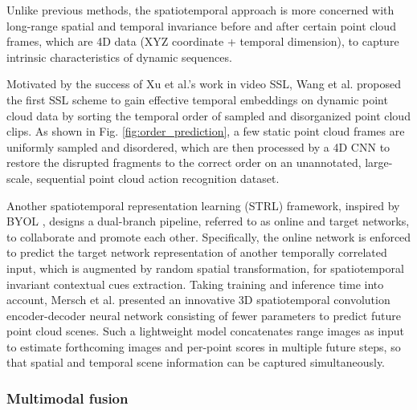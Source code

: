 \documentclass[a4paper,fleqn]{cas-dc}
\begin{document}
Unlike previous methods, the spatiotemporal approach is more concerned with long-range spatial and temporal invariance before and after certain point cloud frames, which are 4D data (XYZ coordinate + temporal dimension), to capture intrinsic characteristics of dynamic sequences.

Motivated by the success of Xu et al.'s work \citep{xu2019self} in video SSL, Wang et al. proposed the first SSL scheme to gain effective temporal embeddings on dynamic point cloud data by sorting the temporal order of sampled and disorganized point cloud clips. As shown in Fig. \ref{fig:order_prediction}, a few static point cloud frames are uniformly sampled and disordered, which are then processed by a 4D CNN to restore the disrupted fragments to the correct order on an unannotated, large-scale, sequential point cloud action recognition dataset. 

Another spatiotemporal representation learning (STRL) \citep{huang2021spatio} framework, inspired by BYOL \citep{grill2020bootstrap}, designs a dual-branch pipeline, referred to as online and target networks, to collaborate and promote each other. Specifically, the online network is enforced to predict the target network representation of another temporally correlated input, which is augmented by random spatial transformation, for spatiotemporal invariant contextual cues extraction. Taking training and inference time into account, Mersch et al. \citep{mersch2022self} presented an innovative 3D spatiotemporal convolution encoder-decoder neural network consisting of fewer parameters to predict future point cloud scenes. Such a lightweight model concatenates range images as input to estimate forthcoming images and per-point scores in multiple future steps, so that spatial and temporal scene information can be captured simultaneously.


\subsubsection{Multimodal fusion}
\end{document}
